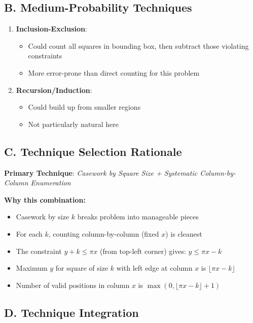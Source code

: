 \documentclass[12pt]{article}
\begin{document}
\begin{conversionbox}
\subsection*{B. Medium-Probability Techniques}

\begin{enumerate}[resume]
    \item \textbf{Inclusion-Exclusion}: 
    \begin{itemize}
        \item Could count all squares in bounding box, then subtract those violating constraints
        \item More error-prone than direct counting for this problem
    \end{itemize}
    
    \item \textbf{Recursion/Induction}: 
    \begin{itemize}
        \item Could build up from smaller regions
        \item Not particularly natural here
    \end{itemize}
\end{enumerate}

\subsection*{C. Technique Selection Rationale}

\textbf{Primary Technique}: \textit{Casework by Square Size + Systematic Column-by-Column Enumeration}

\textbf{Why this combination:}
\begin{itemize}
    \item Casework by size $k$ breaks problem into manageable pieces
    \item For each $k$, counting column-by-column (fixed $x$) is cleanest
    \item The constraint $y + k \leq \pi x$ (from top-left corner) gives: $y \leq \pi x - k$
    \item Maximum $y$ for square of size $k$ with left edge at column $x$ is $\lfloor \pi x - k \rfloor$
    \item Number of valid positions in column $x$ is $\max(0, \lfloor \pi x - k \rfloor + 1)$
\end{itemize}

\subsection*{D. Technique Integration}


\end{conversionbox}
\end{document}
